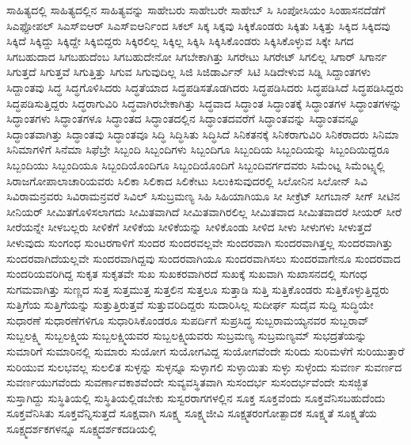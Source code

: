 {ಸಾಹಿತ್ಯದಲ್ಲಿ
ಸಾಹಿತ್ಯದಲ್ಲಿನ
ಸಾಹಿತ್ಯವನ್ನು
ಸಾಹೇಬರು
ಸಾಹೇಬರೇ
ಸಾಹೇಬ್
ಸಿ
ಸಿಂಪೋಸಿಯಂ
ಸಿಂಹಾಸನದೆಡೆಗೆ
ಸಿಎಫ್ಪೋಪಲ್
ಸಿಎಸ್ಐಆರ್
ಸಿಎಸ್ಐಆರ್ನಿಂದ
ಸಿಕಲ್
ಸಿಕ್ಕ
ಸಿಕ್ಕವು
ಸಿಕ್ಕಿಕೊಂಡರು
ಸಿಕ್ಕಿತು
ಸಿಕ್ಕಿತ್ತು
ಸಿಕ್ಕಿದ
ಸಿಕ್ಕಿದವು
ಸಿಕ್ಕಿದೆ
ಸಿಕ್ಕಿದ್ದು
ಸಿಕ್ಕಿದ್ದೇ
ಸಿಕ್ಕಿಬಿದ್ದರು
ಸಿಕ್ಕಿರಲಿಲ್ಲ
ಸಿಕ್ಕಿಲ್ಲ
ಸಿಕ್ಕಿಸಿ
ಸಿಕ್ಕಿಸಿಕೊಂಡರು
ಸಿಕ್ಕಿಸಿಕೊಳ್ಳುವ
ಸಿಕ್ಕೇ
ಸಿಗದ
ಸಿಗಬಹುದಾದ
ಸಿಗಬಹುದೆಂಬ
ಸಿಗಬಹುದೇನೋ
ಸಿಗಬೇಕಾಗಿತ್ತು
ಸಿಗರೇಟು
ಸಿಗರೇಟ್
ಸಿಗಲಿಲ್ಲ
ಸಿಗಾರ್
ಸಿಗಾರ್ನ
ಸಿಗುತ್ತದೆ
ಸಿಗುತ್ತವೆ
ಸಿಗುತ್ತಿತ್ತು
ಸಿಗುವ
ಸಿಗುವುದಿಲ್ಲ
ಸಿಜಿ
ಸಿಜಿಡಾರ್ವಿನ್
ಸಿಟಿ
ಸಿಡಿದೇಳುವ
ಸಿಡ್ನಿ
ಸಿದ್ದಾಂತಗಳು
ಸಿದ್ದಾಂತವು
ಸಿದ್ಧ
ಸಿದ್ಧಗೊಳಿಸಿದರು
ಸಿದ್ಧತೆಯಾದ
ಸಿದ್ಧಪಡಿಸತೊಡಗಿದರು
ಸಿದ್ಧಪಡಿಸಿದರು
ಸಿದ್ಧಪಡಿಸಿದೆ
ಸಿದ್ಧಪಡಿಸಿದ್ದರು
ಸಿದ್ಧಪಡಿಸುತ್ತಿದ್ದರು
ಸಿದ್ಧರಾಗುವಿರಿ
ಸಿದ್ಧವಾಗಿರಬೇಕಾಗಿತ್ತು
ಸಿದ್ಧವಾದ
ಸಿದ್ಧಾಂತ
ಸಿದ್ಧಾಂತಕ್ಕೆ
ಸಿದ್ಧಾಂತಗಳ
ಸಿದ್ಧಾಂತಗಳನ್ನು
ಸಿದ್ಧಾಂತಗಳು
ಸಿದ್ಧಾಂತಗಳೂ
ಸಿದ್ಧಾಂತದ
ಸಿದ್ಧಾಂತದಲ್ಲಿನ
ಸಿದ್ಧಾಂತದವರೆಗೆ
ಸಿದ್ಧಾಂತವನ್ನು
ಸಿದ್ಧಾಂತವನ್ನೂ
ಸಿದ್ಧಾಂತವಾಗಿತ್ತು
ಸಿದ್ಧಾಂತವು
ಸಿದ್ಧಾಂತವೂ
ಸಿದ್ಧಿ
ಸಿದ್ಧಿಸಿತು
ಸಿದ್ಧಿಸಿದೆ
ಸಿನಿಕತನಕ್ಕೆ
ಸಿನಿಕರಾಗುವಿರಿ
ಸಿನಿಕರಾದರು
ಸಿನಿಮಾ
ಸಿನಿಮಾಗಳಿಗೆ
ಸಿನೆಮಾ
ಸಿಫೆಬ್ರೇ
ಸಿಬ್ಬಂದಿ
ಸಿಬ್ಬಂದಿಗಳು
ಸಿಬ್ಬಂದಿಗೂ
ಸಿಬ್ಬಂದಿಯ
ಸಿಬ್ಬಂದಿಯನ್ನು
ಸಿಬ್ಬಂದಿಯಿದ್ದರೂ
ಸಿಬ್ಬಂದಿಯು
ಸಿಬ್ಬಂದಿಯೂ
ಸಿಬ್ಬಂದಿಯೊಂದಿಗೂ
ಸಿಬ್ಬಂದಿಯೊಂದಿಗೆ
ಸಿಬ್ಬಂದಿವರ್ಗದವರು
ಸಿಮೆಂಟ್ನ
ಸಿಮೆಂಟ್ಸ್ನಲ್ಲಿ
ಸಿರಾಜಗೋಪಾಲಾಚಾರಿಯವರು
ಸಿಲಿಕಾ
ಸಿಲಿಕಾದ
ಸಿಲಿಕೇಟು
ಸಿಲುಕಿಸುವುದರಲ್ಲಿ
ಸಿಲೋನಿನ
ಸಿಲೋನ್
ಸಿವಿ
ಸಿವಿರಾಮನ್ರವರು
ಸಿವಿರಾಮನ್ರವರೆ
ಸಿವಿಲ್
ಸಿಸುಬ್ರಮಣ್ಯ
ಸಿಹಿ
ಸಿಹಿಯಾಗಿಯೂ
ಸೀ
ಸೀಕ್ರೆಟ್
ಸೀಗಬಾನ್
ಸೀಗ್
ಸೀಟಿನ
ಸೀನಿಯರ್
ಸೀಮಿತಗೊಳಿಸಲಾಗದು
ಸೀಮಿತವಾಗಿದೆ
ಸೀಮಿತವಾಗಿರಲಿಲ್ಲ
ಸೀಮಿತವಾದ
ಸೀಮಿತವಾದರೆ
ಸೀಯರ್
ಸೀರೆ
ಸೀರೆಯನ್ನೇ
ಸೀಳಬಲ್ಲರು
ಸೀಳಿಕೆಗೆ
ಸೀಳಿಕೆಯ
ಸೀಳಿಕೆಯನ್ನು
ಸೀಳಿಕೊಂಡು
ಸೀಳಿದ
ಸೀಳು
ಸೀಳುಗಳು
ಸೀಳುತ್ತದೆ
ಸೀಳುವುದು
ಸುಂಗಂಧ
ಸುಂಟರಗಾಳಿಗೆ
ಸುಂದರ
ಸುಂದರವಲ್ಲವೇ
ಸುಂದರವಾಗಿ
ಸುಂದರವಾಗಿತ್ತಲ್ಲ
ಸುಂದರವಾಗಿತ್ತು
ಸುಂದರವಾಗಿದೆಯಲ್ಲವೇ
ಸುಂದರವಾಗಿದ್ದವು
ಸುಂದರವಾಗಿಯೂ
ಸುಂದರವಾಗಿಸಲು
ಸುಂದರವಾಗೇನೂ
ಸುಂದರವಾದ
ಸುಂದರಿಯವರಿಗಿದ್ದ
ಸುಕೃತ
ಸುಕೃತವೇ
ಸುಖ
ಸುಖಕರವಾಗಿರದೆ
ಸುಖಕ್ಕೆ
ಸುಖವಾಗಿ
ಸುಖಾಸನದಲ್ಲಿ
ಸುಗಂಧ
ಸುಗಮವಾಗಿತ್ತು
ಸುಣ್ಣದ
ಸುತ್ತ
ಸುತ್ತಮುತ್ತ
ಸುತ್ತಲಿನ
ಸುತ್ತಲೂ
ಸುತ್ತಾಡಿ
ಸುತ್ತಿ
ಸುತ್ತಿಕೊಂಡರು
ಸುತ್ತಿಕೊಳ್ಳುತ್ತಿದ್ದರು
ಸುತ್ತಿಗೆಯ
ಸುತ್ತಿಗೆಯನ್ನು
ಸುತ್ತುತ್ತಿರುತ್ತವೆ
ಸುತ್ತುವರಿದಿದ್ದರು
ಸುದಾರಿಸಿಲ್ಲ
ಸುದೀರ್ಘ
ಸುದೈವ
ಸುದ್ದಿ
ಸುದ್ಧಿಯೇ
ಸುಧಾರಣೆ
ಸುಧಾರಣೆಗಳಿಗೂ
ಸುಧಾರಿಸಿಕೊಂಡರೂ
ಸುಪರ್ದಿಗೆ
ಸುಪ್ರಸಿದ್ಧ
ಸುಬ್ಬರಾಮಯ್ಯನವರ
ಸುಬ್ಬರಾವ್
ಸುಬ್ಬಲಕ್ಷ್ಮಿ
ಸುಬ್ಬಲಕ್ಷ್ಮಿಯ
ಸುಬ್ಬಲಕ್ಷ್ಮಿಯವರ
ಸುಬ್ಬಲಕ್ಷ್ಮಿಯವರು
ಸುಬ್ರಮಣ್ಯ
ಸುಬ್ರಮಣ್ಯಮ್
ಸುಭದ್ರತೆಯನ್ನು
ಸುಮಾರಿಗೆ
ಸುಮಾರಿನಲ್ಲಿ
ಸುಮಾರು
ಸುಯೋಗ
ಸುಯೋಗವಿದ್ದ
ಸುಯೋಗವೆಂದೇ
ಸುರಿದು
ಸುರಿಮಳೆಗೆ
ಸುರಿಯುತ್ತಾರೆ
ಸುರಿಯುವ
ಸುಲಭವಲ್ಲ
ಸುಲಲಿತ
ಸುಳ್ಳನ್ನು
ಸುಳ್ಳನ್ನೂ
ಸುಳ್ಳಾಗಲಿ
ಸುಳ್ಳಾಯಿತು
ಸುಳ್ಳು
ಸುಳ್ಳೆಂದು
ಸುವರ್ಣ
ಸುವರ್ಣದ
ಸುವರ್ಣಯುಗವೆಂದು
ಸುವರ್ಣಾವಕಾಶವೆಂದೇ
ಸುವ್ಯವಸ್ಥಿತವಾಗಿ
ಸುಸಂದರ್ಭ
ಸುಸಂದರ್ಭವೆಂದೇ
ಸುಸಜ್ಜಿತ
ಸುಸ್ತಾಗಿದ್ದು
ಸುಸ್ಥಿತಿಯಲ್ಲಿ
ಸುಸ್ಥಿತಿಯಲ್ಲಿಡಬೇಕು
ಸುಸ್ವರರಾಗಗಳಲ್ಲಿನ
ಸೂಕ್ತ
ಸೂಕ್ತವೆಂದು
ಸೂಕ್ತವೆನಿಸಬಹುದೆಂದು
ಸೂಕ್ತವೆನಿಸಿತು
ಸೂಕ್ತವೆನ್ನಿಸುತ್ತದೆ
ಸೂಕ್ಷವಾಗಿ
ಸೂಕ್ಷ್ಮ
ಸೂಕ್ಷ್ಮಜೀವಿ
ಸೂಕ್ಷ್ಮತರಂಗೋತ್ಪಾದಕ
ಸೂಕ್ಷ್ಮತೆ
ಸೂಕ್ಷ್ಮತೆಯ
ಸೂಕ್ಷ್ಮದರ್ಶಕಗಳನ್ನೂ
ಸೂಕ್ಷ್ಮದರ್ಶಕದಡಿಯಲ್ಲಿ
}
